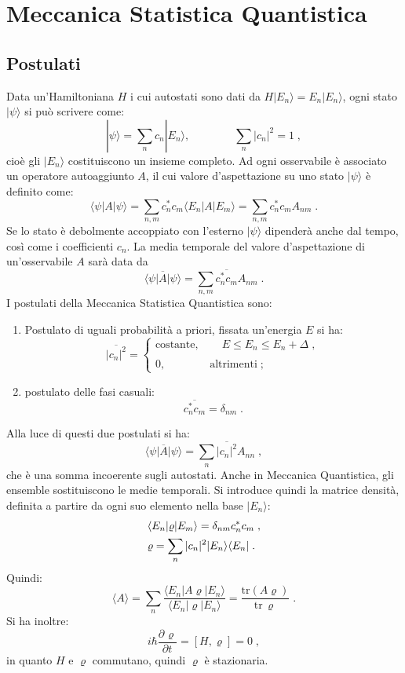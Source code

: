 \documentclass[10pt,a4paper]{report}
\theoremstyle{definition}
\newcommand{\pdev}[3][]{\frac{\partial^{#1} #2}{\partial #3^{#1}}}
\numberwithin{equation}{section}
\newcommand{\bra}{\langle}
\newcommand{\ket}{\rangle}
\newcommand{\tr}{\mathrm{tr}}
\begin{document}
\chapter{Meccanica Statistica Quantistica}
\section{Postulati}
Data un'Hamiltoniana $H$ i cui autostati sono dati da $H|E_n\ket=E_n|E_n\ket$, ogni stato $|\psi\ket$ si può scrivere come:
$$
|\psi\ket=\sum_n c_n|E_n\ket,\qquad\qquad \sum_n |c_n|^2=1\;,
$$
cioè gli $|E_n\ket$ costituiscono un insieme completo. Ad ogni osservabile è associato un operatore autoaggiunto $A$, il cui valore d'aspettazione su uno stato $|\psi\ket$ è definito come:
$$
\bra \psi|A|\psi\ket=\sum_{n,m}c_n^*c_m\bra E_n|A|E_m\ket=\sum_{n,m}c_n^*c_m A_{nm}\;.
$$
Se lo stato è debolmente accoppiato con l'esterno $|\psi\ket$ dipenderà anche dal tempo, così come i coefficienti $c_n$. La media temporale del valore d'aspettazione di un'osservabile $A$ sarà data da
$$
\overline{\bra \psi|A|\psi\ket}=\sum_{n,m}\overline{c_n^*c_m}A_{nm}\;.
$$
I postulati della Meccanica Statistica Quantistica sono:
\begin{enumerate}
\item Postulato di uguali probabilità a priori, fissata un'energia $E$ si ha:
\begin{equation}
\overline{|c_n|^2}=\begin{cases}
\mbox{costante},\qquad E\le E_n\le E_n+\Delta\;, \\
\\
0,\qquad\qquad \mbox{altrimenti}\;;
\end{cases}
\end{equation}
\item postulato delle fasi casuali:
\begin{equation}
\overline{c_n^*c_m}=\delta_{nm}\;.
\end{equation}
\end{enumerate}
Alla luce di questi due postulati si ha:
\begin{equation}
\overline{\bra \psi|A|\psi\ket}=\sum_n \overline{|c_n|^2}A_{nn}\;,
\end{equation}
che è una somma incoerente sugli autostati. Anche in Meccanica Quantistica, gli ensemble sostituiscono le medie temporali. Si introduce quindi la matrice densità, definita a partire da ogni suo elemento nella base $|E_n\ket$:
\begin{align}
&\bra E_n|\varrho|E_m\ket = \delta_{nm}c_n^*c_m \notag \;,\\
&\varrho = \sum_n |c_n|^2|E_n\ket\bra E_n|\;.
\end{align}
Quindi:
\begin{equation}
\bra A\ket=\sum_n \frac{\bra E_n|A\varrho|E_n\ket}{\bra E_n|\varrho|E_n\ket}=\frac{\tr(A\varrho)}{\tr\,\varrho}\;.
\end{equation}
Si ha inoltre:
\begin{equation}
i\hbar\pdev{\varrho}{t}=[H,\varrho]=0\;,
\end{equation}
in quanto $H$ e $\varrho$ commutano, quindi $\varrho$ è stazionaria.
\end{document}

